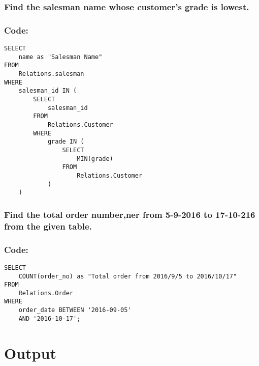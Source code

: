 \documentclass[12pt]{article}
\begin{document}
\vspace{10mm}

\subsubsection{Find the salesman name whose customer’s grade is lowest.}
\subsubsection*{Code: }
\begin{verbatim}
SELECT
    name as "Salesman Name"
FROM
    Relations.salesman
WHERE
    salesman_id IN (
        SELECT
            salesman_id
        FROM
            Relations.Customer
        WHERE
            grade IN (
                SELECT
                    MIN(grade)
                FROM
                    Relations.Customer
            )
    ) 
\end{verbatim}
\vspace{10mm}

\subsubsection{Find the total order number,ner from 5-9-2016 to 17-10-216 from the given table.}
\subsubsection*{Code: }
\begin{verbatim}
SELECT
    COUNT(order_no) as "Total order from 2016/9/5 to 2016/10/17"
FROM
    Relations.Order
WHERE
    order_date BETWEEN '2016-09-05'
    AND '2016-10-17';
\end{verbatim}


\section{Output}

\end{document}

